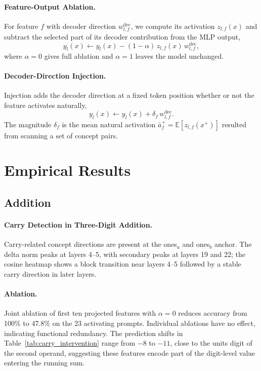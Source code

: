 \paragraph{Feature-Output Ablation.}

For feature \(f\) with decoder direction \(w_{l,f}^{\mathrm{dec}}\), we compute its
activation \(z_{l,f}(x)\) and subtract the selected part of its decoder contribution
from the MLP output,
\begin{equation}
y_l(x) \leftarrow y_l(x) - (1-\alpha)\, z_{l,f}(x)\, w_{l,f}^{\mathrm{dec}},
\label{eq:ablation}
\end{equation}
where \(\alpha=0\) gives full ablation and \(\alpha=1\) leaves the model unchanged.

\paragraph{Decoder-Direction Injection.}

Injection adds the decoder direction at a fixed token position whether or not the
feature activates naturally,
\begin{equation}
y_l(x) \leftarrow y_l(x) + \delta_f\, w_{l,f}^{\mathrm{dec}}.
\label{eq:injection}
\end{equation}
The magnitude \(\delta_f\) is the mean natural activation
\(\bar{a}_f^+=\mathbb{E}[z_{l,f}(x^+)]\) resulted from scanning a set of 
concept pairs. 

\section{Empirical Results}
\label{sec:concept_results}

\subsection{Addition}
\label{sec:carry_results}

\paragraph{Carry Detection in Three-Digit Addition.}
Carry-related concept directions are present  at the ones$_a$ and ones$_b$ anchor.
The delta norm peaks at layers 4--5, with secondary peaks at layers 19 and 22; the
cosine heatmap shows a block transition near layers 4--5 followed by a stable carry
direction in later layers. 

\paragraph{Ablation.}
Joint ablation of first ten projected features with \(\alpha=0\) reduces accuracy from 100\% to 47.8\% on the
23 activating prompts. Individual ablations have no effect, indicating functional
redundancy. The prediction shifts in Table~\ref{tab:carry_intervention} range from
\(-8\) to \(-11\), close to the units digit of the second operand, suggesting these
features encode part of the digit-level value entering the running sum.

